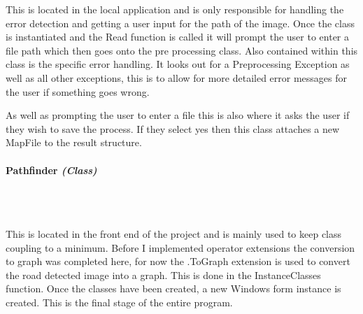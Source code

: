 \begin{FlushLeft}
    This is located in the local application and is only responsible for handling the error detection and getting a user input for the path of the image. Once the class is instantiated and the Read function is called it will prompt the user to enter a file path which then goes onto the pre processing class. Also contained within this class is the specific error handling. It looks out for a Preprocessing Exception as well as all other exceptions, this is to allow for more detailed error messages for the user if something goes wrong.\\\bk

    As well as prompting the user to enter a file this is also where it asks the user if they wish to save the process. If they select yes then this class attaches a new MapFile to the result structure. \\
    \bk

\paragraph{Pathfinder \textit{(Class)}} \mbox{} \\

    \begin{figure}[H]
        \centering
    \end{figure}\\

    This is located in the front end of the project and is mainly used to keep class coupling to a minimum. Before I implemented operator extensions the conversion to graph was completed here, for now the .ToGraph extension is used to convert the road detected image into a graph. This is done in the InstanceClasses function. Once the classes have been created, a new Windows form instance is created. This is the final stage of the entire program. \\

    \bk


\end{FlushLeft}
